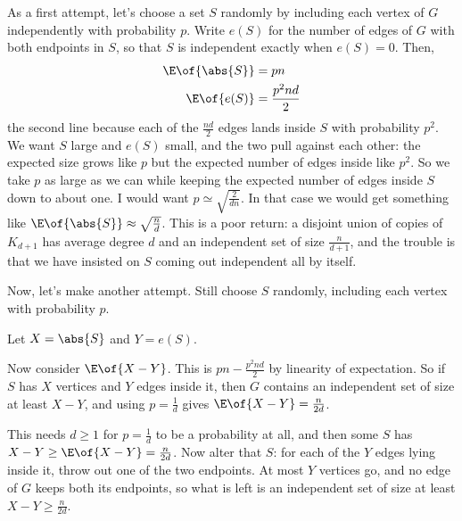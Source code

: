 As a first attempt, let's choose a set $S$ randomly by including each vertex of $G$ independently with probability $p$. Write $e(S)$ for the number of edges of $G$ with both endpoints in $S$, so that $S$ is independent exactly when $e(S) = 0$. Then,
\begin{align*}
    \E\of{\abs{S}} &= pn \\
    \E\of{e(S)} &= \frac{p^2 n d}{2}
\end{align*}
the second line because each of the $\frac{nd}{2}$ edges lands inside $S$ with probability $p^2$. We want $S$ large and $e(S)$ small, and the two pull against each other: the expected size grows like $p$ but the expected number of edges inside like $p^2$. So we take $p$ as large as we can while keeping the expected number of edges inside $S$ down to about one. I would want $p \simeq \sqrt{\frac{2}{dn}}$. In that case we would get something like $\E\of{\abs{S}} \approx \sqrt{\frac{n}{d}}$. This is a poor return: a disjoint union of copies of $K_{d + 1}$ has average degree $d$ and an independent set of size $\frac{n}{d + 1}$, and the trouble is that we have insisted on $S$ coming out independent all by itself.

Now, let's make another attempt. Still choose $S$ randomly, including each vertex with probability $p$.

Let $X = \abs{S}$ and $Y = e(S)$.

Now consider $\E\of{X - Y}$. This is $pn - \frac{p^2 n d}{2}$ by linearity of expectation. So if $S$ has $X$ vertices and $Y$ edges inside it, then $G$ contains an independent set of size at least $X - Y$, and using $p = \frac{1}{d}$ gives $\E\of{X - Y} = \frac{n}{2d}$.

This needs $d \geq 1$ for $p = \frac{1}{d}$ to be a probability at all, and then some $S$ has $X - Y \geq \E\of{X - Y} = \frac{n}{2d}$. Now alter that $S$: for each of the $Y$ edges lying inside it, throw out one of the two endpoints. At most $Y$ vertices go, and no edge of $G$ keeps both its endpoints, so what is left is an independent set of size at least $X - Y \geq \frac{n}{2d}$.

